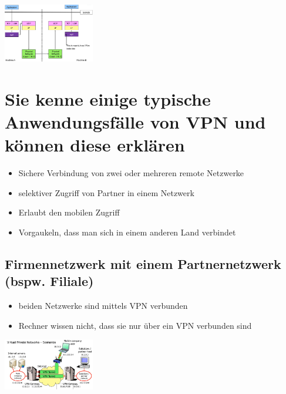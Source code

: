 \documentclass{report}
\newenvironment{Figure}
	{\par\medskip\noindent\minipage{\linewidth}}
	{\endminipage\par\medskip}
\theoremstyle{definition}
\theoremstyle{example}
\begin{document}
\begin{Figure}
\centering
\includegraphics[width=150px]{img/WireGuardMessageFlow.png}
	\label{fig:Abbildung über das Schema mittels WireGuard}
\end{Figure}

\section{Sie kenne einige typische Anwendungsfälle von VPN und können diese erklären}
\begin{itemize}
	\item Sichere Verbindung von zwei oder mehreren remote Netzwerke
	\item selektiver Zugriff von Partner in einem Netzwerk
	\item Erlaubt den mobilen Zugriff
	\item Vorgaukeln, dass man sich in einem anderen Land verbindet
\end{itemize}

	\subsection{Firmennetzwerk mit einem Partnernetzwerk (bspw. Filiale)}
\begin{itemize}
	\item beiden Netzwerke sind mittels VPN verbunden
	\item Rechner wissen nicht, dass sie nur über ein VPN verbunden sind
\end{itemize}

\begin{Figure}
\centering
\includegraphics[width=150px]{img/VPNScenariosI.png}
	\label{fig:Abbildung eines möglichen VPN-Szenarios(1)}
\end{Figure}
\end{document}
